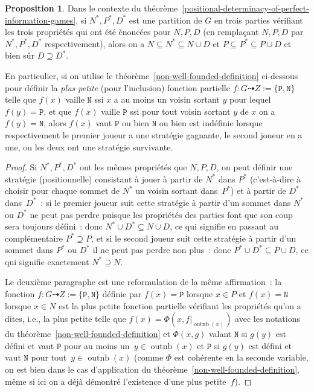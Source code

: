\documentclass[12pt,a4paper]{article}
\theoremstyle{definition}
\newtheorem{prop}[comcnt]{Proposition}
\newcommand{\outnb}{\operatorname{outnb}}
\begin{document}
\begin{prop}\label{p-d-n-vertices-of-perfect-information-games}
Dans le contexte du
théorème \ref{positional-determinacy-of-perfect-information-games}, si
$N^*,P^*,D^*$ est une partition de $G$ en trois parties vérifiant les
trois propriétés qui ont été énoncées pour $N,P,D$ (en remplaçant
$N,P,D$ par $N^*,P^*,D^*$ respectivement), alors on a $N\subseteq N^*
\subseteq N\cup D$ et $P\subseteq P^* \subseteq P\cup D$ et bien sûr
$D\supseteq D^*$.

En particulier, si on utilise le
théorème \ref{non-well-founded-definition} ci-dessous pour définir la
\emph{plus petite} (pour l'inclusion) fonction partielle $f\colon G
\dasharrow Z := \{\mathtt{P}, \mathtt{N}\}$ telle que $f(x)$ vaille
$\mathtt{N}$ ssi $x$ a au moins un voisin sortant $y$ pour lequel
$f(y) = \mathtt{P}$, et que $f(x)$ vaille $\mathtt{P}$ ssi pour tout
voisin sortant $y$ de $x$ on a $f(y) = \mathtt{N}$, alors $f(x)$ vaut
$\mathtt{P}$ ou bien $\mathtt{N}$ ou bien est indéfinie lorsque
respectivement le premier joueur a une stratégie gagnante, le second
joueur en a une, ou les deux ont une stratégie survivante.
\end{prop}
\begin{proof}
Si $N^*,P^*,D^*$ ont les mêmes propriétés que $N,P,D$, on peut définir
une stratégie (positionnelle) consistant à jouer à partir de $N^*$
dans $P^*$ (c'est-à-dire à choisir pour chaque sommet de $N^*$ un
voisin sortant dans $P^*$) et à partir de $D^*$ dans $D^*$ : si le
premier joueur suit cette stratégie à partir d'un sommet dans $N^*$ ou
$D^*$ ne peut pas perdre puisque les propriétés des parties font que
son coup sera toujours défini : donc $N^* \cup D^* \subseteq N \cup
D$, ce qui signifie en passant au complémentaire $P^* \supseteq P$, et
si le second joueur suit cette stratégie à partir d'un sommet dans
$P^*$ ou $D^*$ il ne peut pas perdre non plus : donc $P^* \cup D^*
\subseteq P \cup D$, ce qui signifie exactement $N^* \supseteq N$.

Le deuxième paragraphe est une reformulation de la même affirmation :
la fonction $f \colon G \dasharrow Z := \{\mathtt{P}, \mathtt{N}\}$
définie par $f(x) = \mathtt{P}$ lorsque $x \in P$ et $f(x) =
\mathtt{N}$ lorsque $x \in N$ est la plus petite fonction partielle
vérifiant les propriétés qu'on a dites, i.e., la plus petite telle que
$f(x) = \Phi(x, f|_{\outnb(x)})$ avec les notations du
théorème \ref{non-well-founded-definition} et $\Phi(x, g)$ valant
$\mathtt{N}$ si $g(y)$ est défini et vaut $\mathtt{P}$ pour au moins
un $y \in \outnb(x)$ et $\mathtt{P}$ si $g(y)$ est défini et vaut
$\mathtt{N}$ pour tout $y \in \outnb(x)$ (comme $\Phi$ est cohérente
en la seconde variable, on est bien dans le cas d'application
du théorème \ref{non-well-founded-definition}, même si ici on a déjà
démontré l'existence d'une plus petite $f$).
\end{proof}
\end{document}
